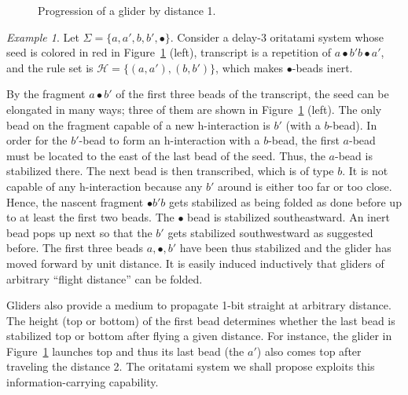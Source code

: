 \documentclass{article}
\theoremstyle{remark}
\newtheorem{example}{Example}
\begin{document}
\begin{figure}[htb]
{}
\caption{Progression of a glider by distance 1.}
\label{fig:glider}
\end{figure}


\begin{example}\label{ex:glider}
Let $\Sigma = \{a, a', b, b', \bullet\}$. 
Consider a delay-3 oritatami system whose seed is colored in red in Figure~\ref{fig:glider} (left), transcript is a repetition of $a \bullet b' b \bullet a'$, and the rule set is $\mathcal{H} = \{(a, a'), (b, b')\}$, which makes $\bullet$-beads inert. 

By the fragment $a \bullet b'$ of the first three beads of the transcript, the seed can be elongated in many ways; three of them are shown in Figure~\ref{fig:glider} (left). 
The only bead on the fragment capable of a new h-interaction is $b'$ (with a $b$-bead).
In order for the $b'$-bead to form an h-interaction with a $b$-bead, the first $a$-bead must be located to the east of the last bead of the seed. 
Thus, the $a$-bead is stabilized there. 
The next bead is then transcribed, which is of type $b$.
It is not capable of any h-interaction because any $b'$ around is either too far or too close.  
Hence, the nascent fragment $\bullet b' b$ gets stabilized as being folded as done before up to at least the first two beads. 
The $\bullet$ bead is stabilized southeastward. 
An inert bead pops up next so that the $b'$ gets stabilized southwestward as suggested before. 
The first three beads $a, \bullet, b'$ have been thus stabilized and the glider has moved forward by unit distance. 
It is easily induced inductively that gliders of arbitrary ``flight distance'' can be folded. 


Gliders also provide a medium to propagate 1-bit straight at arbitrary distance. 
The height (top or bottom) of the first bead determines whether the last bead is stabilized top or bottom after flying a given distance.
For instance, the glider in Figure~\ref{fig:glider} launches top and thus its last bead (the $a'$) also comes top after traveling the distance 2.
The oritatami system we shall propose exploits this information-carrying capability.
\end{example}
\end{document}
